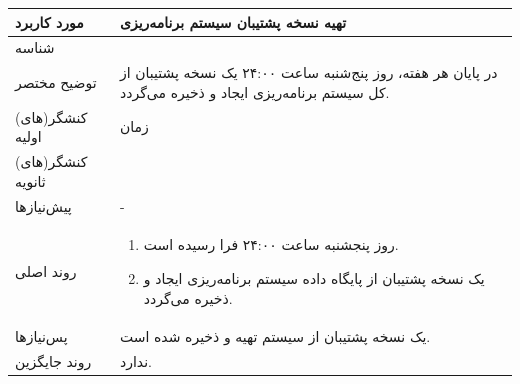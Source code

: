 \begin{table}[H]
	\centering
	\begin{tabular}{|p{3cm}|p{10cm}|}
		\hline
		مورد کاربرد & تهیه نسخه پشتیبان سیستم برنامه‌ریزی  \\
		\hline
		شناسه & 
		\stepcounter{usecase_ID}
		\arabic{usecase_ID} \\
		\hline
		توضیح مختصر & در پایان هر هفته، روز پنج‌شنبه ساعت ۲۴:۰۰ یک نسخه پشتیبان از کل سیستم برنامه‌ریزی ایجاد و ذخیره می‌گردد. \\
		\hline
		کنشگر(های) اولیه & زمان \\
		\hline
		کنشگر(های) ثانویه &  \\
		\hline
		پیش‌نیازها & - \\
		\hline
		
		روند اصلی &
		\begin{enumerate}[topsep=0cm,leftmargin=0.5cm]
			\item روز پنجشنبه ساعت ۲۴:۰۰ فرا رسیده است.
			\item یک نسخه پشتیبان از پایگاه داده سیستم برنامه‌ریزی ایجاد و ذخیره می‌گردد.
		\end{enumerate} \\
		
		\hline
		پس‌نیازها & یک نسخه پشتیبان از سیستم تهیه و ذخیره شده است. \\
		\hline
		روند جایگزین & ندارد. \\
		\hline
	\end{tabular}
\end{table}